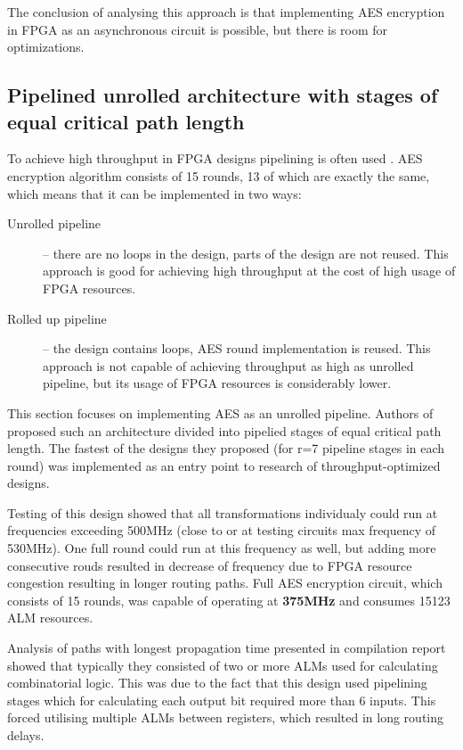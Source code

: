 The conclusion of analysing this approach is that implementing AES encryption in FPGA as an asynchronous circuit is possible, but there is room for optimizations.


\subsection{Pipelined unrolled architecture with stages of equal critical path length}
To achieve high throughput in FPGA designs pipelining is often used \cite[Chapter 1]{kilts2007advanced}. AES encryption algorithm consists of 15 rounds, 13 of which are exactly the same, which means that it can be implemented in two ways:
\begin{description}
\item[Unrolled pipeline] -- there are no loops in the design, parts of the design are not reused. This approach is good for achieving high throughput at the cost of high usage of FPGA resources.
\item[Rolled up pipeline] -- the design contains loops, AES round implementation is reused. This approach is not capable of achieving throughput as high as unrolled pipeline, but its usage of FPGA resources is considerably lower.
\end{description}

This section focuses on implementing AES as an unrolled pipeline. Authors of \cite{vlsi} proposed such an architecture divided into pipelied stages of equal critical path length. The fastest of the designs they proposed \cite[Fig. 11]{vlsi} (for r=7 pipeline stages in each round) was implemented as an entry point to research of throughput-optimized designs.

Testing of this design showed that all transformations individualy could run at frequencies exceeding 500MHz (close to or at testing circuits max frequency of 530MHz). One full round could run at this frequency as well, but adding more consecutive rouds resulted in decrease of frequency due to FPGA resource congestion resulting in longer routing paths. Full AES encryption circuit, which consists of 15 rounds, was capable of operating at \textbf{375MHz} and consumes 15123 ALM resources.

Analysis of paths with longest propagation time presented in compilation report showed that typically they consisted of two or more ALMs used for calculating combinatorial logic. This was due to the fact that this design used pipelining stages which for calculating each output bit required more than 6 inputs. This forced utilising multiple ALMs between registers, which resulted in long routing delays.

